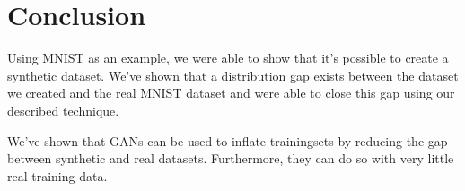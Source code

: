 \documentclass[10pt,twocolumn,letterpaper]{article}
\begin{document}

\section{Conclusion}

Using MNIST as an example, we were able to show that it's possible to create a synthetic dataset. We've shown that a distribution gap exists between the dataset we created and the real MNIST dataset and were able to close this gap using our described technique.

We've shown that GANs can be used to inflate trainingsets by reducing the gap between synthetic and real datasets. Furthermore, they can do so with very little real training data.

{\small


}

\end{document}
